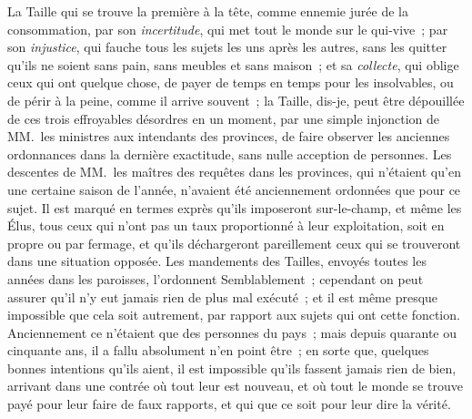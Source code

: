 \documentclass[french,twoside]{book} %
\begin{document}
La Taille qui se trouve la première à la tête, comme ennemie jurée de la consommation, par son {\itshape incertitude}, qui met tout le monde sur le qui-vive ; par son {\itshape injustice}, qui fauche tous les sujets les uns après les autres, sans les quitter qu’ils ne soient sans pain, sans meubles et sans maison ; et sa {\itshape collecte}, qui oblige ceux qui ont quelque chose, de payer de temps en temps pour les insolvables, ou de périr à la peine, comme il arrive souvent ; la Taille, dis-je, peut être dépouillée de ces trois effroyables désordres en un moment, par une simple injonction de MM. les ministres aux intendants des provinces, de faire observer les anciennes ordonnances dans la dernière exactitude, sans nulle acception de personnes. Les descentes de MM. les maîtres des requêtes dans les provinces, qui n’étaient qu’en une certaine saison de l’année, n’avaient été anciennement ordonnées que pour ce sujet. Il est marqué en termes exprès qu’ils imposeront sur-le-champ, et même les Élus, tous ceux qui n’ont pas un taux proportionné à leur exploitation, soit en propre ou par fermage, et qu’ils déchargeront pareillement ceux qui se trouveront dans une situation opposée. Les mandements des Tailles, envoyés toutes les années dans les paroisses, l’ordonnent Semblablement ; cependant on peut assurer qu’il n’y eut jamais rien de plus mal exécuté ; et il est même presque impossible que cela soit autrement, par rapport aux sujets qui ont cette fonction. Anciennement ce n’étaient que des personnes du pays ; mais depuis quarante ou cinquante ans, il a fallu absolument n’en point être ; en sorte que, quelques bonnes intentions qu’ils aient, il est impossible qu’ils fassent jamais rien de bien, arrivant dans une contrée où tout leur est nouveau, et où tout le monde se trouve payé pour leur faire de faux rapports, et qui que ce soit pour leur dire la vérité.\par
\end{document}
